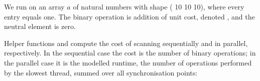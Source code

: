 \begin{code}[hide]%
%
\>[2]\AgdaSpace{}%
\AgdaSpace{}%
\AgdaSpace{}%
\AgdaSpace{}%
\<%
\end{code}
We run  on an array $a$ of natural numbers with shape ( 10
  10   10), where every entry equals one.  The binary
operation is addition of unit cost, denoted , and the neutral
element is zero.
Helper functions  and  compute the cost of scanning
sequentially and in parallel, respectively.  In the sequential case the cost is
the number of binary operations; in the parallel case it is the modelled
runtime, \ie{} the number of operations performed by the slowest thread, summed
over all synchronisation points:

